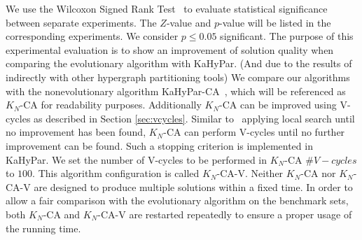 \documentclass[a4paper,12pt,titlepage, BCOR7mm,headsepline]{scrbook}
\numberwithin{equation}{section}
\begin{document}
We use the Wilcoxon Signed Rank Test~\cite{wilcoxon1945individual} to evaluate statistical significance between separate experiments. The $Z$-value and $p$-value will be listed in the corresponding experiments. We consider $p \le 0.05$ significant.
The purpose of this experimental evaluation is to show an improvement of solution quality when comparing the evolutionary algorithm with KaHyPar. (And due to the results of~\cite{akhremtsev2017engineering} indirectly with other hypergraph partitioning tools)
We compare our algorithms with the nonevolutionary algorithm KaHyPar-CA~\cite{heuer2017improving}, which will be referenced as $K_N$-CA for readability purposes.
Additionally $K_N$-CA can be improved using V-cycles as described in Section \ref{sec:vcycles}. Similar to~\cite{armstrong2010investigation} applying local search until no improvement has been found, $K_N$-CA can perform V-cycles until no further improvement can be found. Such a stopping criterion is implemented in KaHyPar. We set the number of V-cycles to be performed in $K_N$-CA $\#V-cycles$ to $100$. This algorithm configuration is called $K_N$-CA-V.
Neither $K_N$-CA nor $K_N$-CA-V are designed to produce multiple solutions within a fixed time. In order to allow a fair comparison with the evolutionary algorithm on the benchmark sets, both $K_N$-CA and $K_N$-CA-V are restarted repeatedly to ensure a proper usage of the running time.

\end{document}
